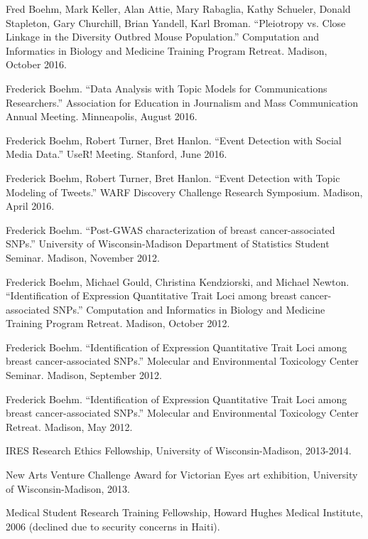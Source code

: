 \documentclass[11pt,article,oneside]{memoir}
\begin{document}
\ind Fred Boehm, Mark Keller, Alan Attie, Mary Rabaglia, Kathy Schueler, Donald Stapleton, Gary Churchill, Brian Yandell, Karl Broman. ``Pleiotropy vs. Close Linkage in the Diversity Outbred Mouse Population.'' Computation and Informatics in Biology and Medicine Training Program Retreat. Madison, October 2016.

\ind Frederick Boehm. ``Data Analysis with Topic Models for Communications Researchers.'' Association for Education in Journalism and Mass Communication Annual Meeting. Minneapolis, August 2016.

\ind Frederick Boehm, Robert Turner, Bret Hanlon. ``Event Detection with Social Media Data.'' UseR! Meeting. Stanford, June 2016.

\ind Frederick Boehm, Robert Turner, Bret Hanlon. ``Event Detection with Topic Modeling of Tweets.'' WARF Discovery Challenge Research Symposium. Madison, April 2016.

\ind Frederick Boehm. ``Post-GWAS characterization of breast cancer-associated SNPs.'' University of Wisconsin-Madison Department of Statistics Student Seminar. Madison, November 2012.

\ind Frederick Boehm, Michael Gould, Christina Kendziorski, and Michael Newton. ``Identification of Expression Quantitative Trait Loci among breast cancer-associated SNPs.'' Computation and Informatics in Biology and Medicine Training Program Retreat. Madison, October 2012.

\ind Frederick Boehm. ``Identification of Expression Quantitative Trait Loci among breast cancer-associated SNPs.'' Molecular and Environmental Toxicology Center Seminar. Madison, September 2012.


\ind Frederick Boehm. ``Identification of Expression Quantitative Trait Loci among breast cancer-associated SNPs.'' Molecular and Environmental Toxicology Center Retreat. Madison, May 2012.


\bigskip 

\medskip

\ind IRES Research Ethics Fellowship, University of Wisconsin-Madison, 2013-2014.

\ind New Arts Venture Challenge Award for Victorian Eyes art exhibition, University of Wisconsin-Madison, 2013.

\ind Medical Student Research Training Fellowship, Howard Hughes Medical Institute, 2006 (declined due to security concerns in Haiti).
\end{document}
